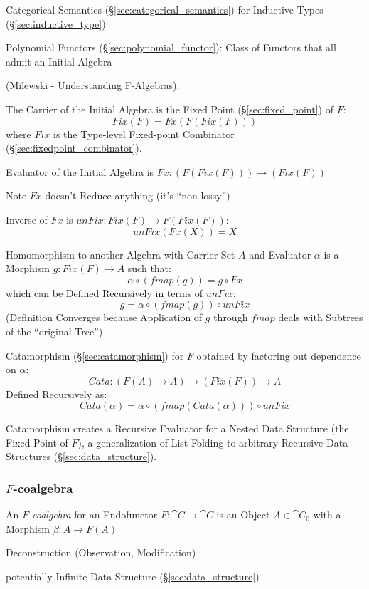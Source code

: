 Categorical Semantics (\S\ref{sec:categorical_semantics}) for
Inductive Types (\S\ref{sec:inductive_type})

Polynomial Functors (\S\ref{sec:polynomial_functor}): Class of Functors that all
admit an Initial Algebra %

(Milewski - Understanding F-Algebras):

The Carrier of the Initial Algebra is the Fixed Point
(\S\ref{sec:fixed_point}) of $F$:
\[
  Fix (F) = Fx (F (Fix (F)))
\]
where $Fix$ is the Type-level Fixed-point Combinator
(\S\ref{sec:fixedpoint_combinator}).

Evaluator of the Initial Algebra is $Fx : (F (Fix (F))) \rightarrow
(Fix (F))$

\fist Note $Fx$ doesn't Reduce anything (it's ``non-lossy'')

Inverse of $Fx$ is $unFix : Fix (F) \rightarrow F (Fix (F))$:
\[
  unFix (Fx (X)) = X
\]

Homomorphism to another Algebra with Carrier Set $A$ and Evaluator
$\alpha$ is a Morphism $g : Fix (F) \rightarrow A$ such that:
\[
  \alpha \circ (fmap (g)) = g \circ Fx
\]
which can be Defined Recursively in terms of $unFix$:
\[
  g = \alpha \circ (fmap (g)) \circ unFix
\]
(Definition Converges because Application of $g$ through $fmap$ deals
with Subtrees of the ``original Tree'')

Catamorphism (\S\ref{sec:catamorphism}) for $F$ obtained by factoring
out dependence on $\alpha$:
\[
  Cata : (F (A) \rightarrow A) \rightarrow (Fix (F)) \rightarrow A
\]
Defined Recursively as:
\[
  Cata (\alpha) = \alpha \circ (fmap (Cata (\alpha))) \circ unFix
\]

Catamorphism creates a Recursive Evaluator for a Nested Data Structure
(the Fixed Point of $F$), a generalization of List Folding to
arbitrary Recursive Data Structures (\S\ref{sec:data_structure}).



\subsubsection{$F$-coalgebra}\label{sec:f_coalgebra}

An \emph{$F$-coalgebra} for an Endofunctor $F : \cat{C} \rightarrow
\cat{C}$ is an Object $A \in \cat{C}_0$ with a Morphism $\beta : A
\rightarrow F(A)$ \cite{corfield08}

Deconstruction (Observation, Modification)

potentially Infinite Data Structure (\S\ref{sec:data_structure})

